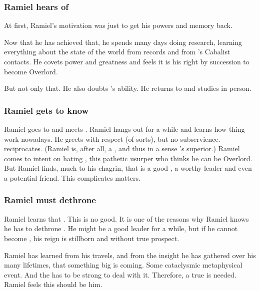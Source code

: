 \subsubsection{Ramiel hears of \Dasteron}
At first, Ramiel's motivation was just to get his powers and memory back. 

Now that he has achieved that, he spends many days doing research, learning everything about the state of the world from records and from \Cishiel's Cabalist contacts.
He covets power and greatness and feels it is his right by succession to become Overlord.

But not only that.
He also doubts \Dasteron's ability.
He returns to \Mystraacht and studies \Dasteron in person.





\subsubsection{Ramiel gets to know \Dasteron}
Ramiel goes to \Mystraacht and meets \Dasteron.
Ramiel hangs out for a while and learns how thing work nowadays.
He greets \Dasteron with respect (of sorts), but no subservience.
\Dasteron reciprocates. (Ramiel is, after all, a \sathariah, and thus in a sense \Dasteron's superior.)
Ramiel comes to \Mystraacht intent on hating \Dasteron, this pathetic usurper who thinks he can be Overlord.
But Ramiel finds, much to his chagrin, that \Dasteron is a good \resphan, a worthy leader and even a potential friend.
This complicates matters.





\subsubsection{Ramiel must dethrone \Dasteron}
Ramiel learns that . 
This is no good. 
It is one of the reasons why Ramiel knows he has to dethrone \Dasteron. 
He might be a good leader for a while, but if he cannot become \apex{}, his reign is stillborn and without true prospect. 

Ramiel has learned from his travels, and from the insight he has gathered over his many lifetimes, that something big is coming. 
Some cataclysmic metaphysical event. 
And the \Mystraacht{} \matrix{} has to be strong to deal with it. 
Therefore, a true \apex{} is needed. 
Ramiel feels this \apex{} should be him. 

